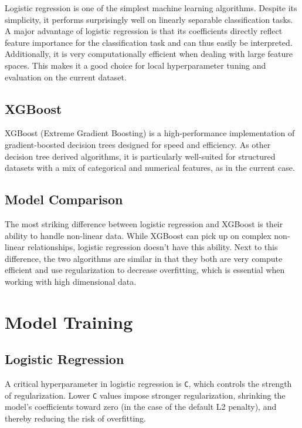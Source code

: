 \documentclass[twocolumn]{article}
\begin{document}
Logistic regression is one of the simplest machine learning algorithms. Despite its simplicity, it performs surprisingly well on linearly separable classification tasks. A major advantage of logistic regression is that its coefficients directly reflect feature importance for the classification task and can thus easily be interpreted. Additionally, it is very computationally efficient when dealing with large feature spaces. This makes it a good choice for local hyperparameter tuning and evaluation on the current dataset.

\subsection{XGBoost}

XGBoost (Extreme Gradient Boosting) is a high-performance implementation of gradient-boosted decision trees designed for speed and efficiency. \parencite{chenXGBoostScalableTree2016} As other decision tree derived algorithms, it is particularly well-suited for structured datasets with a mix of categorical and numerical features, as in the current case.

\subsection{Model Comparison}

The most striking difference between logistic regression and XGBoost is their ability to handle non-linear data. While XGBoost can pick up on complex non-linear relationships, logistic regression doesn't have this ability. 
Next to this difference, the two algorithms are similar in that they both are very compute efficient and use regularization to decrease overfitting, which is essential when working with high dimensional data.

\section{Model Training}

\subsection{Logistic Regression}

A critical hyperparameter in logistic regression is \texttt{C}, which controls the strength of regularization. Lower \texttt{C} values impose stronger regularization, shrinking the model's coefficients toward zero (in the case of the default L2 penalty), and thereby reducing the risk of overfitting.
\end{document}
